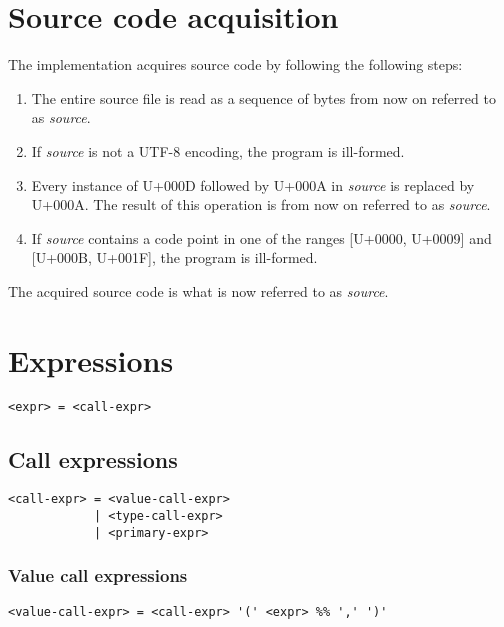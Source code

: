 \documentclass[12pt]{memoir}
\newcommand{\var}[1]{\emph{#1}}
\newcommand{\cp}[1]{U+#1}
\begin{document}
\chapter{Source code acquisition}

The implementation acquires source code by following the following steps:

\begin{enumerate}
  \item The entire source file is read as a sequence of bytes from now on
        referred to as \var{source}.
  \item If \var{source} is not a UTF-8 encoding, the program is ill-formed.
  \item Every instance of \cp{000D} followed by \cp{000A} in \var{source} is
        replaced by \cp{000A}. The result of this operation is from now on
        referred to as \var{source}.
  \item If \var{source} contains a code point in one of the ranges
        [\cp{0000}, \cp{0009}] and [\cp{000B}, \cp{001F}], the program is
        ill-formed.
\end{enumerate}

The acquired source code is what is now referred to as \var{source}.

\chapter{Expressions}

\begin{verbatim}
<expr> = <call-expr>
\end{verbatim}

\section{Call expressions}

\begin{verbatim}
<call-expr> = <value-call-expr>
            | <type-call-expr>
            | <primary-expr>
\end{verbatim}

\subsection{Value call expressions}

\begin{verbatim}
<value-call-expr> = <call-expr> '(' <expr> %% ',' ')'
\end{verbatim}
\end{document}
